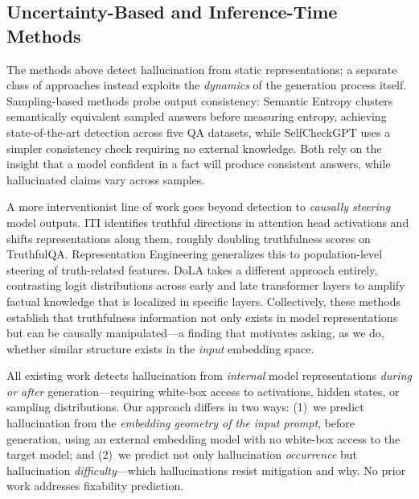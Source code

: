 \subsection{Uncertainty-Based and Inference-Time Methods}

The methods above detect hallucination from static representations; a separate class of approaches instead exploits the \emph{dynamics} of the generation process itself.  Sampling-based methods probe output consistency: Semantic Entropy \citep{farquhar2024detecting} clusters semantically equivalent sampled answers before measuring entropy, achieving state-of-the-art detection across five QA datasets, while SelfCheckGPT \citep{manakul2023selfcheckgpt} uses a simpler consistency check requiring no external knowledge.  Both rely on the insight that a model confident in a fact will produce consistent answers, while hallucinated claims vary across samples.

A more interventionist line of work goes beyond detection to \emph{causally steering} model outputs.  ITI \citep{li2024inferencetime} identifies truthful directions in attention head activations and shifts representations along them, roughly doubling truthfulness scores on TruthfulQA.  Representation Engineering \citep{zou2023representation} generalizes this to population-level steering of truth-related features.  DoLA \citep{chuang2024dola} takes a different approach entirely, contrasting logit distributions across early and late transformer layers to amplify factual knowledge that is localized in specific layers.  Collectively, these methods establish that truthfulness information not only exists in model representations but can be causally manipulated---a finding that motivates asking, as we do, whether similar structure exists in the \emph{input} embedding space.

All existing work detects hallucination from \emph{internal} model representations \emph{during or after} generation---requiring white-box access to activations, hidden states, or sampling distributions.  Our approach differs in two ways: (1)~we predict hallucination from the \emph{embedding geometry of the input prompt}, before generation, using an external embedding model with no white-box access to the target model; and (2)~we predict not only hallucination \emph{occurrence} but hallucination \emph{difficulty}---which hallucinations resist mitigation and why.  No prior work addresses fixability prediction.


